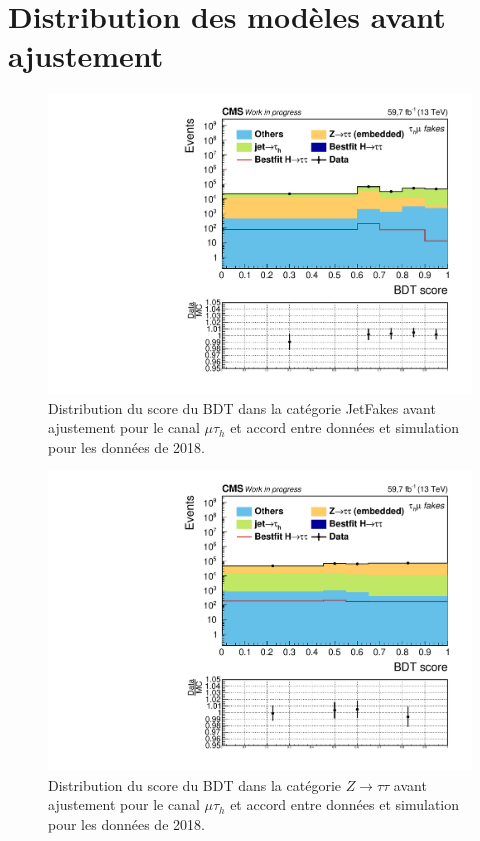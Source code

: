 \chapter{Distribution des modèles avant ajustement}
\label{annexA}

\begin{figure}[h!]
        \centering
        \includegraphics[scale=0.3]{Chapitre7/Images/histFakesdataMC2018_postfit.pdf} 
    \caption{Distribution du score du BDT dans la catégorie JetFakes avant ajustement pour le canal $\mu\tau_h$ et accord entre données et simulation pour les données de 2018.}
\end{figure}

\begin{figure}[h!]
        \centering
        \includegraphics[scale=0.3]{Chapitre7/Images/histZTTdataMC2018_postfit.pdf} 
    \caption{Distribution du score du BDT dans la catégorie $Z\to\tau\tau$ avant ajustement pour le canal $\mu\tau_h$ et accord entre données et simulation pour les données de 2018.}
\end{figure}

